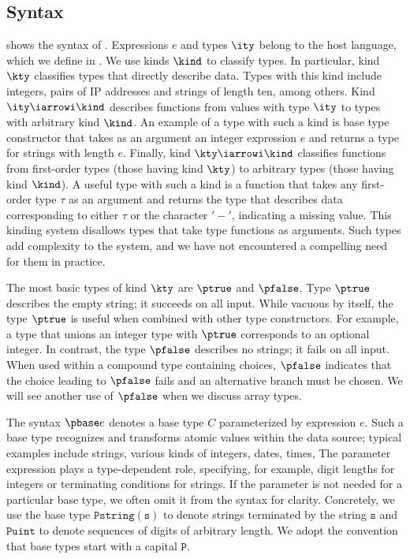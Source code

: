 \subsection{\ddca{} Syntax}
\label{sec:ddc-syntax}

 shows the syntax of \ddc{}. Expressions $e$
and types $\ity$ belong to the host language, which we define in .  
We use kinds $\kind$ to classify types. 
In particular, kind $\kty$ classifies types that directly describe
data.  Types with this kind include integers, 
pairs of IP addresses and strings of length ten, among others.
Kind $\ity \iarrowi \kind$ describes
functions from values with type $\ity$ to types with arbitrary kind
$\kind$.  An example of a type with such a kind is base type
constructor  that takes as an argument an integer
expression $e$ and returns a type for strings with length $e$.
Finally, kind $\kty \iarrowi \kind$ classifies
functions from first-order types (those having kind $\kty$) to
arbitrary types (those having kind $\kind$).  
A useful type with such a kind is a function that takes any
first-order type $\tau$ as an argument and returns the type that
describes data corresponding to either $\tau$ or the character
$\mathtt{'-'}$, indicating a missing value.
This kinding system disallows types that take type functions as
arguments.  Such types add complexity to the system, and we have not
encountered a compelling need for them in practice. 

The most basic types of kind $\kty$ are $\ptrue$ and $\pfalse$.  Type $\ptrue$
describes the empty string; it succeeds on all input.  While vacuous
by itself, the type $\ptrue$ is useful when combined with 
other type constructors.  For example, a type that unions an integer
type with $\ptrue$ corresponds to an optional integer.  In contrast,
the type $\pfalse$ describes no strings; it fails on all input.  
When used within a compound type containing choices, $\pfalse$
indicates that the choice leading to $\pfalse$ fails and an
alternative branch must be chosen.  We will see another use of
$\pfalse$ when we discuss array types.

The syntax $\pbase e$ denotes a base type $C$ parameterized by 
expression $e$.  
 Such a base type recognizes and transforms atomic values within the data
 source; typical examples include strings, various kinds of integers,
 dates, times, \etc{} The parameter expression plays a type-dependent role,
 specifying, for example, digit lengths for integers or terminating
 conditions for strings. If the parameter is not needed for a
 particular base type, we often omit it from the syntax for
 clarity. Concretely, we use the base type $\mathtt{Pstring(s)}$
 to denote strings terminated by the string $\mathtt{s}$
 and $\mathtt{Puint}$ to denote sequences of digits of arbitrary
 length.  We adopt the convention that base types start with a
 capital $\mathtt{P}$.

